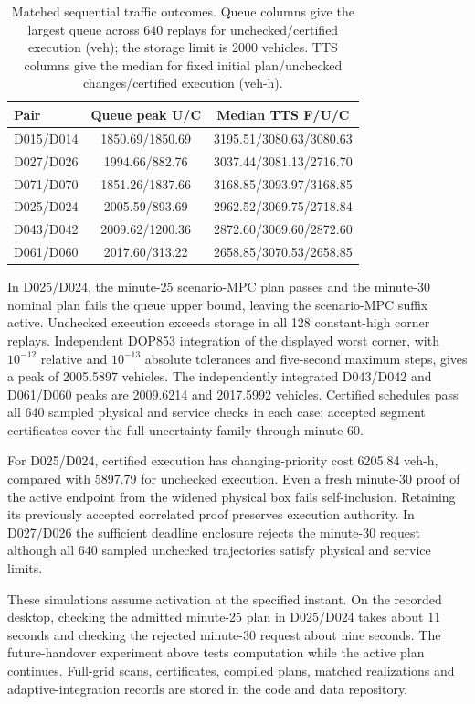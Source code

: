 \documentclass[journal,10pt]{IEEEtran}
\begin{document}
\begin{table}[t]
\centering\small
\caption{Matched sequential traffic outcomes. Queue columns give the
largest queue across 640 replays for unchecked/certified execution (veh);
the storage limit is 2000 vehicles. TTS columns give the median for fixed
initial plan/unchecked changes/certified execution (veh-h).}
\label{tab:supp-sequential-traffic}
\setlength{\tabcolsep}{5pt}
\begin{tabular}{@{}lcc@{}}
\toprule
Pair & Queue peak U/C & Median TTS F/U/C\\
\midrule
D015/D014 & 1850.69/1850.69 & 3195.51/3080.63/3080.63\\
D027/D026 & 1994.66/882.76 & 3037.44/3081.13/2716.70\\
D071/D070 & 1851.26/1837.66 & 3168.85/3093.97/3168.85\\
D025/D024 & 2005.59/893.69 & 2962.52/3069.75/2718.84\\
D043/D042 & 2009.62/1200.36 & 2872.60/3069.60/2872.60\\
D061/D060 & 2017.60/313.22 & 2658.85/3070.53/2658.85\\
\bottomrule
\end{tabular}
\end{table}

In D025/D024, the minute-25 scenario-MPC plan passes and the minute-30
nominal plan fails the queue upper bound, leaving the scenario-MPC suffix
active. Unchecked execution exceeds storage in all 128 constant-high
corner replays. Independent DOP853 integration of the displayed worst
corner, with $10^{-12}$ relative and $10^{-13}$ absolute tolerances and
five-second maximum steps, gives a peak of 2005.5897 vehicles. The
independently integrated D043/D042 and D061/D060 peaks are 2009.6214 and
2017.5992 vehicles. Certified schedules pass all 640 sampled physical and
service checks in each case; accepted segment certificates cover the full
uncertainty family through minute 60.

For D025/D024, certified execution has changing-priority cost 6205.84
veh-h, compared with 5897.79 for unchecked execution. Even a fresh
minute-30 proof of the active endpoint from the widened physical box
fails self-inclusion. Retaining its previously accepted correlated proof
preserves execution authority. In D027/D026 the sufficient deadline
enclosure rejects the minute-30 request although all 640 sampled unchecked
trajectories satisfy physical and service limits.

These simulations assume activation at the specified instant. On the
recorded desktop, checking the admitted minute-25 plan in D025/D024 takes
about 11 seconds and checking the rejected minute-30 request about nine
seconds. The future-handover experiment above tests computation while the
active plan continues. Full-grid scans, certificates, compiled plans,
matched realizations and adaptive-integration records are stored in the
code and data repository.
\end{document}
